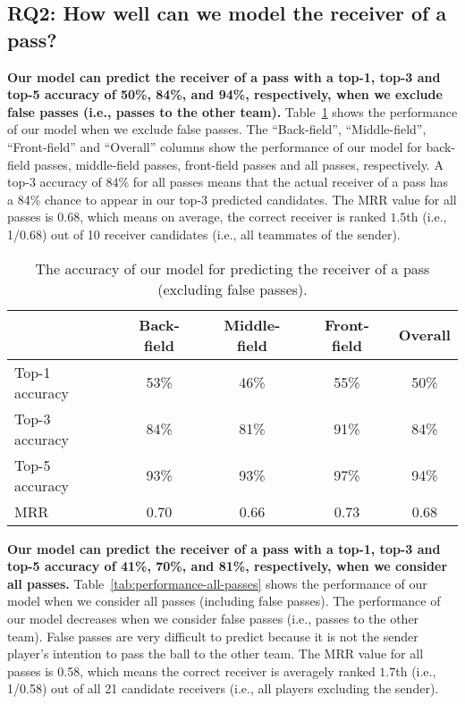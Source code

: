 \subsection{RQ2: How well can we model the receiver of a pass?}\label{RQ2-results}

\textbf{Our model can predict the receiver of a pass with a top-1, top-3 and top-5 accuracy of 50\%, 84\%, and 94\%, respectively, when we exclude false passes (i.e., passes to the other team).}
Table~\ref{tab:performance-accurate-passes} shows the performance of our model when we exclude false passes. 
The ``Back-field'', ``Middle-field'', ``Front-field'' and ``Overall'' columns show the performance of our model for back-field passes, middle-field passes, front-field passes and all passes, respectively. 
A top-3 accuracy of 84\% for all passes means that the actual receiver of a pass has a 84\% chance to appear in our top-3 predicted candidates.
The MRR value for all passes is 0.68, which means on average, the correct receiver is ranked $1.5$th (i.e., 1/0.68) out of 10 receiver candidates (i.e., all teammates of the sender).


\begin{table}[!t]
\caption{The accuracy of our model for predicting the receiver of a pass (excluding false passes).}
\centering
\begin{tabular}{lcccc}
  \hline
  & Back-field & Middle-field & Front-field & Overall \\
  \hline
  Top-1 accuracy & 53\% & 46\% & 55\% & 50\% \\
  Top-3 accuracy & 84\% & 81\% & 91\% & 84\% \\
  Top-5 accuracy & 93\% & 93\% & 97\% & 94\% \\
  MRR & 0.70 & 0.66 & 0.73 & 0.68 \\
  \hline
\end{tabular}
\label{tab:performance-accurate-passes}
\vspace{-0.3cm}
\end{table}

\textbf{Our model can predict the receiver of a pass with a top-1, top-3 and top-5 accuracy of 41\%, 70\%, and 81\%, respectively, when we consider all passes.}
Table~\ref{tab:performance-all-passes} shows the performance of our model when we consider all passes (including false passes). 
The performance of our model decreases when we consider false passes (i.e., passes to the other team). 
False passes are very difficult to predict because it is not the sender player's intention to pass the ball to the other team. 
The MRR value for all passes is 0.58, which means the correct receiver is averagely ranked $1.7$th (i.e., 1/0.58) out of all 21 candidate receivers (i.e., all players excluding the sender).

